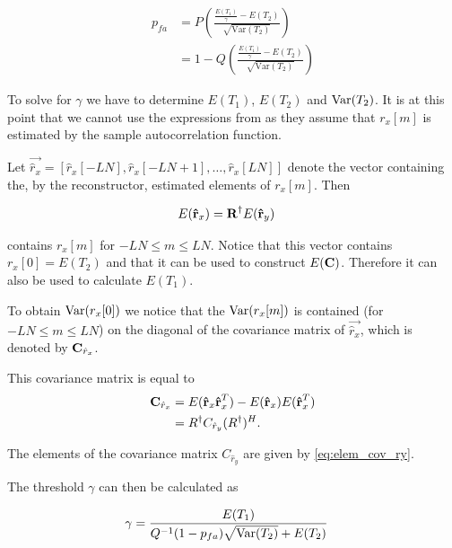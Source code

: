 \documentclass[a4paper, openany, oneside]{memoir}
\begin{document}
\begin{align*}
p_{fa} &= P\left(\frac{\frac{E\left(T_1\right)}{\gamma} - E\left(T_2\right) }{\sqrt{\text{Var}(T_2)}}\right)\\
&= 1-Q\left(\frac{\frac{E\left(T_1\right)}{\gamma} - E\left(T_2\right) }{\sqrt{\text{Var}(T_2)}}\right) 
\end{align*}

To solve for $\gamma$ we have to determine $E\left(T_1\right)$, $E\left(T_2\right)$ and $\operatorname{Var}(T_2)$. It is at this point that we cannot use the expressions from \cite{zheng2009spectrum} as they assume that $r_x[m]$ is estimated by the sample autocorrelation function. 

Let $\vec{\hat{r}_x} = \left[\hat{r}_x[-LN], \hat{r}_x[-LN+1] , \ldots, \hat{r}_x[LN]\right]$ denote the vector containing the, by the reconstructor, estimated elements of $r_x[m]$. Then 

\begin{align*}
E(\boldsymbol{\mathbf{\hat{r}}}_x) &= \boldsymbol{\mathbf{R}}^{\dagger}E(\boldsymbol{\mathbf{\hat{r}}}_y)
\end{align*}

contains $r_x[m]$ for $-LN \leq m \leq LN$. Notice that this vector contains $r_x[0] = E(T_2)$ and that it can be used to construct $E(\boldsymbol{\mathbf{C}})$. Therefore it can also be used to calculate $E(T_1)$.

To obtain $\operatorname{Var}(r_x[0])$ we notice that the $\operatorname{Var}(r_x[m])$ is contained (for $-LN \leq m \leq LN$) on the diagonal of the covariance matrix of $\vec{\hat{r}_x}$, which is denoted by $\boldsymbol{\mathbf{C}}_{\hat{r}_x}$.

This covariance matrix is equal to
\begin{align*}
\boldsymbol{\mathbf{C}}_{\hat{r}_x} &= E(\boldsymbol{\mathbf{\hat{r}}}_x\boldsymbol{\mathbf{\hat{r}}}_x^T) - E(\boldsymbol{\mathbf{\hat{r}}}_x) E(\boldsymbol{\mathbf{\hat{r}}}_x^T)\\
&= R^{\dagger}C_{\hat{r}_y}(R^{\dagger})^H.
\end{align*}

The elements of the covariance matrix $C_{\hat{r}_y}$ are given by \cref{eq:elem_cov_ry}.

The threshold $\gamma$ can then be calculated as

\begin{align*}
\gamma &= \frac{E(T_1)}{Q^{-1}(1-p_{fa})\sqrt{\operatorname{Var}(T_2)}+E(T_2)}
\end{align*}
\end{document}
